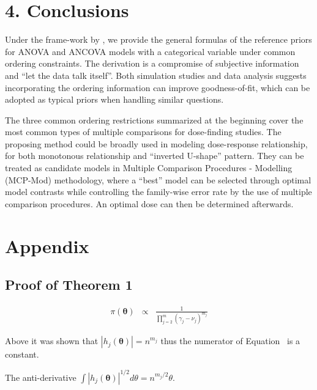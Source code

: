 \documentclass[Proceedings]{ascelike}
\begin{document}
\section{4. Conclusions}
Under the frame-work by \cite{BergerBernardo1992}, we provide the
general formulas of the reference priors for ANOVA and ANCOVA models
with a categorical variable under common ordering constraints. The
derivation is a compromise of subjective information and ``let the
data talk itself''. Both simulation studies and data analysis suggests
incorporating the ordering information can improve goodness-of-fit,
which can be adopted as typical priors when handling similar
questions.

The three common ordering restrictions summarized at the beginning
cover the most common types of multiple comparisons for dose-finding
studies. The proposing method could be broadly used in modeling
dose-response relationship, for both monotonous relationship and
``inverted U-shape'' pattern. They can be treated as candidate models
in Multiple Comparison Procedures - Modelling (MCP-Mod) methodology,
where a ``best'' model can be selected through optimal model contrasts
while controlling the family-wise error rate by the use of multiple
comparison procedures. An optimal dose can then be determined
afterwards.

\pagebreak
%
%
%
\section*{Appendix}

\subsection*{Proof of Theorem 1}

\begin{eqnarray*}
\pi(\boldsymbol{\theta}) &\propto& \frac{1}{\prod_{j=2}^{m}\left(\gamma_j - \nu_j\right)^{m_j}} \label{thm1}
\end{eqnarray*}

Above it was shown that $|h_j(\boldsymbol{\theta})|=n^{m_j}$ thus the
numerator of Equation~\cite{Lemma1} is a constant.


The anti-derivative $\int |h_j(\boldsymbol{\theta})|^{1/2} d\theta = n^{m_j/2}\theta$. 
\end{document}
